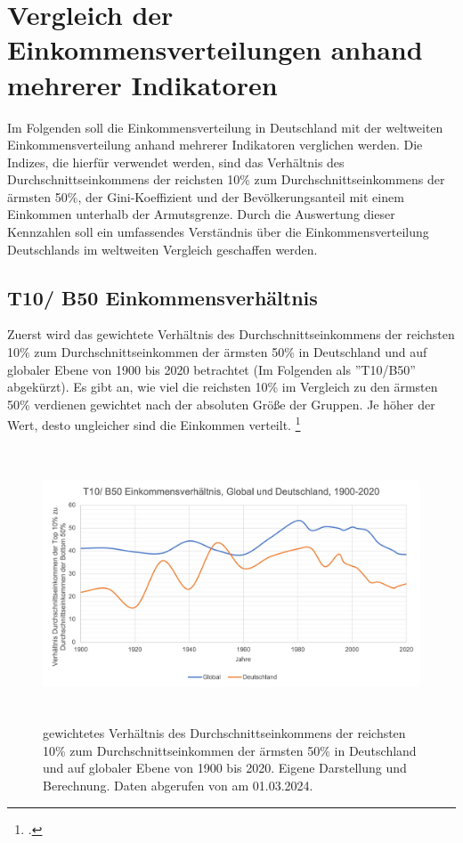 \chapter{Vergleich der Einkommensverteilungen anhand mehrerer Indikatoren}

Im Folgenden soll die Einkommensverteilung in Deutschland mit der weltweiten Einkommensverteilung anhand mehrerer Indikatoren verglichen werden. Die Indizes, die hierfür verwendet werden, sind das Verhältnis des Durchschnittseinkommens der reichsten 10\% zum Durchschnittseinkommens der ärmsten 50\%, der Gini-Koeffizient und der Bevölkerungsanteil mit einem Einkommen unterhalb der Armutsgrenze. Durch die Auswertung dieser Kennzahlen soll ein umfassendes Verständnis über die Einkommensverteilung Deutschlands im weltweiten Vergleich geschaffen werden.
\section{T10/ B50 Einkommensverhältnis}

Zuerst wird das gewichtete Verhältnis des Durchschnittseinkommens der reichsten 10\% zum Durchschnittseinkommen der ärmsten 50\% in Deutschland und auf globaler Ebene von 1900 bis 2020 betrachtet (Im Folgenden als ''T10/B50'' abgekürzt). Es gibt an, wie viel die reichsten 10\% im Vergleich zu den ärmsten 50\% verdienen gewichtet nach der absoluten Größe der Gruppen. Je höher der Wert, desto ungleicher sind die Einkommen verteilt. \footcite[Vgl.][S. 31]{wir_2022}

\begin{figure}[H]
    \centering
    \includegraphics[height=8.15cm]{Bilder/T10B50-Ratio.png}
    \caption[T10/B50-Verhältnis, Deutschland und global, 1900-2020]{gewichtetes Verhältnis des Durchschnittseinkommens der reichsten 10\% zum Durchschnittseinkommen der ärmsten 50\% in Deutschland und auf globaler Ebene von 1900 bis 2020. Eigene Darstellung und Berechnung. Daten abgerufen von \cite[][, S.55, 195]{wir_2022} am 01.03.2024.}
    \label{fig:iso_norm}
\end{figure}

